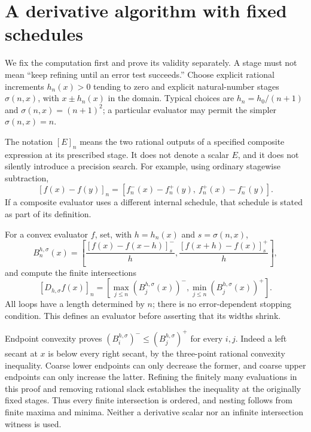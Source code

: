 \section{A derivative algorithm with fixed schedules}
\label{sec:fixed-schedule-derivative}

We fix the computation first and prove its validity separately.  A stage
must not mean ``keep refining until an error test succeeds.''  Choose
explicit rational increments $h_n(x)>0$ tending to zero and explicit
natural-number stages $\sigma(n,x)$, with $x\pm h_n(x)$ in the domain.
Typical choices are $h_n=h_0/(n+1)$ and $\sigma(n,x)=(n+1)^2$; a
particular evaluator may permit the simpler $\sigma(n,x)=n$.

The notation $[E]_n$ means the two rational outputs of a specified
composite expression at its prescribed stage.  It does not denote a scalar
$E$, and it does not silently introduce a precision search.  For example,
using ordinary stagewise subtraction,
\[
 [f(x)-f(y)]_n=
 [f_n^-(x)-f_n^+(y),\ f_n^+(x)-f_n^-(y)].
\]
If a composite evaluator uses a different internal schedule, that schedule
is stated as part of its definition.

\begin{definition}
\label{def:computed-derivative}
For a convex evaluator $f$, set, with $h=h_n(x)$ and $s=\sigma(n,x)$,
\[
 B_n^{h,\sigma}(x)=
 \left[\frac{[f(x)-f(x-h)]_s^-}{h},
       \frac{[f(x+h)-f(x)]_s^+}{h}\right],
\]
and compute the finite intersections
\[
 [D_{h,\sigma}f(x)]_n=
 \left[\max_{j\le n}(B_j^{h,\sigma}(x))^-,
       \min_{j\le n}(B_j^{h,\sigma}(x))^+\right].
\]
All loops have a length determined by $n$; there is no error-dependent
stopping condition.  This defines an evaluator before asserting that its
widths shrink.
\end{definition}

Endpoint convexity proves $(B_i^{h,\sigma})^-\le(B_j^{h,\sigma})^+$
for every $i,j$.  Indeed a left secant at $x$ is below every right secant,
by the three-point rational convexity inequality.  Coarse lower endpoints
can only decrease the former, and coarse upper endpoints can only increase
the latter.  Refining the finitely many evaluations in this proof and
removing rational slack establishes the inequality at the originally fixed
stages.  Thus every finite intersection is ordered, and nesting follows
from finite maxima and minima.  Neither a derivative scalar nor an infinite
intersection witness is used.

